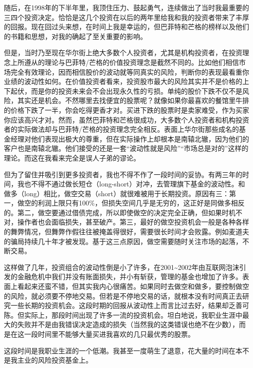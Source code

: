 随后，在1998年的下半年里，我顶住压力、鼓起勇气，连续做出了当时我最重要的三四个投资决定。恰恰是这几个投资在以后的两年里给我和我的投资者带来了丰厚的回报。现在回过头来想，在时间上我是幸运的，但巴菲特和芒格的榜样以及他们的书籍和思想，对我的确起了至关重要的影响。
\par

但是，当时乃至现在华尔街上绝大多数个人投资者，尤其是机构投资者，在投资理念上所遵从的理论与巴菲特/芒格的价值投资理念是截然不同的。比如他们相信市场完全有效理论，因而相信股价的波动就等同真实的风险，判断你的表现最看重你业绩的波动性如何。在价值投资者看来，投资股市最大的风险其实并不是价格的上下起伏，而是你的投资未来会不会出现永久性的亏损。单纯的股价下跌不仅不是风险，其实还是机会。不然哪里去找便宜的股票呢？就像如果你最喜欢的餐馆里牛排的价格下跌了一半，你会吃得更香才对。买进下跌的股票时是卖家难受，作为买家你应该高兴才对。然而，虽然巴菲特和芒格很成功，大多数个人投资者和机构投资者的实际做法却与巴菲特/芒格的投资理念完全相反。表面上华尔街那些成名的基金经理对他们表现出极大的尊重，但在实际操作上却根本是南辕北辙，因为他们的客户也是南辕北辙。他们接受的还是一套“波动性就是风险”“市场总是对的”这样的理论。而这在我看来完全是误人子弟的谬论。
\par

但为了留住并吸引到更多投资者，我也不得不作了一段时间的妥协。有两三年的时间，我也不得不通过做长短仓（long-short）对冲，去管理旗下基金的波动性。和做多（long）相比，做空交易（short）就很难被用于长期投资。原因有三：第一，做空的利润上限只有100\%，但损失空间几乎是无穷的，这正好是同做多相反的。第二，做空要通过借债完成，所以即使做空的决定完全正确，但如果时机不对，操作者也会面临损失，甚至破产。第三，最好的做空投资机会一般是各种各样的舞弊情况，但舞弊作假往往被掩盖得很好，需要很长时间才会败露。例如麦道夫的骗局持续几十年才被发现。基于这三点原因，做空需要随时关注市场的起落，不断交易。
\par

这样做了几年，投资组合的波动性倒是小了许多，在2001\textasciitilde{}2002年由互联网泡沫引发的金融危机中我们并没有账面损失，并小有斩获，管理的基金也增加了许多。表面上看起来还蛮不错，但其实我内心很痛苦。如果同时去做空和做多，要控制做空的风险，就必须要不停地交易。但若是不停地交易的话，就根本没有时间真正去研究一些长期的投资机会。这段时期的回报从波动性上而言比过去好，结果却乏善可陈。但实际上，那段时间出现了许多一流的投资机会。坦白地说，我职业生涯中最大的失败并不是由我错误决定造成的损失（当然我的这类错误也绝不在少数），而是在这一段时间里不能够大量买进我喜欢的几只最优秀的股票。
\par

这段时间是我职业生涯的一个低潮。我甚至一度萌生了退意，花大量的时间在本不是我主业的风险投资基金上。
\par

